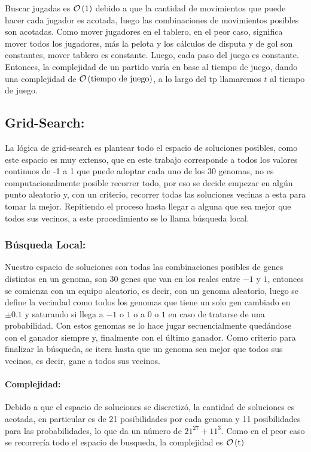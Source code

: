 Buscar jugadas es $\mathcal{O}\left(1\right)$ debido a que la cantidad de movimientos que puede
hacer cada jugador es acotada, luego las combinaciones de movimientos posibles
son acotadas. Como mover jugadores en el tablero, en el peor caso, significa
mover todos los jugadores, más la pelota y los cálculos de disputa y de gol son
constantes, mover tablero es constante. Luego, cada paso del juego es constante.
Entonces, la complejidad de un partido varía en base al tiempo de juego, dando
una complejidad de $\mathcal{O}\left(\textrm{tiempo de juego}\right)$, a lo largo del tp
llamaremos $t$ al tiempo de juego.

\subsection{Grid-Search:}

La lógica de grid-search es plantear todo el espacio de soluciones posibles,
como este espacio es muy extenso, que en este trabajo corresponde a todos los
valores continuos de -1 a 1 que puede adoptar cada uno de los 30 genomas, no es
computacionalmente posible recorrer todo, por eso se decide empezar en algún
punto aleatorio y, con un criterio, recorrer todas las soluciones vecinas a esta
para tomar la mejor. Repitiendo el proceso hasta llegar a alguna que sea mejor que
todos sus vecinos, a este procedimiento se lo llama búsqueda local.


\subsubsection{Búsqueda Local:}


Nuestro espacio de soluciones son todas las combinaciones posibles de genes
distintos en un genoma, son 30 genes que van en los reales entre $-1$ y $1$,
entonces se comienza con un equipo aleatorio, es decir, con un genoma aleatorio,
luego se define la vecindad como todos los genomas que tiene un solo gen
cambiado en $\pm 0.1$ y saturando si llega a $-1$ o $1$ o a $0$ o $1$ en caso de
tratarse de una probabilidad. Con estos genomas se lo hace jugar secuencialmente
quedándose con el ganador siempre y, finalmente con el último ganador. Como
criterio para finalizar la búsqueda, se itera hasta que un genoma sea
mejor que todos sus vecinos, es decir, gane a todos sus vecinos.

\paragraph{Complejidad:} Debido a que el espacio de soluciones se discretizó, la
cantidad de soluciones es acotada, en particular es de 21 posibilidades por cada
genoma y 11 posibilidades para las probabilidades, lo que da un número de
$21^{27}+11^3$. Como en el peor caso se recorrería todo el espacio de busqueda,
la complejidad es $\mathcal{O}\left(\textrm{t}\right)$

